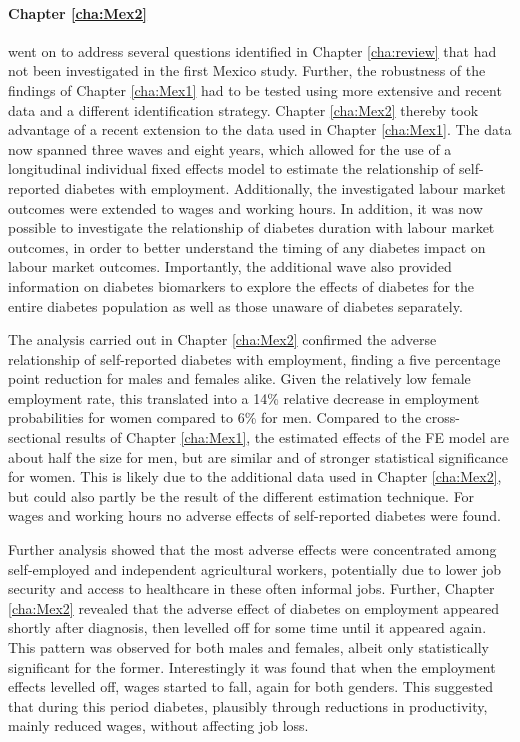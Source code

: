 \paragraph{Chapter \ref{cha:Mex2}}  went on to address several questions identified in Chapter \ref{cha:review} that had not been investigated in the first Mexico study. Further, the robustness of the findings of Chapter \ref{cha:Mex1} had to be tested using more extensive and recent data and a different identification strategy. Chapter \ref{cha:Mex2} thereby took advantage of a recent extension to the data used in Chapter \ref{cha:Mex1}. The data now spanned three waves and eight years, which allowed for the use of a longitudinal individual fixed effects model to estimate the relationship of self-reported diabetes with employment. Additionally, the investigated labour market outcomes were extended to wages and working hours. In addition, it was now possible to investigate the relationship of diabetes duration with labour market outcomes, in order to better understand the timing of any diabetes impact on labour market outcomes. Importantly, the additional wave also provided information on diabetes biomarkers to explore the effects of diabetes for the entire diabetes population as well as those unaware of diabetes separately.

The analysis carried out in Chapter \ref{cha:Mex2} confirmed the adverse relationship of self-reported diabetes with employment, finding a five percentage point reduction for males and females alike. Given the relatively low female employment rate, this translated into a 14\% relative decrease in employment probabilities for women compared to 6\% for men. Compared to the cross-sectional results of Chapter \ref{cha:Mex1}, the estimated effects of the \ac{FE} model are about half the size for men, but are similar and of stronger statistical significance for women. This is likely due to the additional data used in Chapter \ref{cha:Mex2}, but could also partly be the result of the different estimation technique. For wages and working hours no adverse effects of self-reported diabetes were found.

Further analysis showed that the most adverse effects were concentrated among self-employed and independent agricultural workers, potentially due to lower job security and access to healthcare in these often informal jobs. Further, Chapter \ref{cha:Mex2} revealed that the adverse effect of diabetes on employment appeared shortly after diagnosis, then levelled off for some time until it appeared again. This pattern was observed for both males and females, albeit only statistically significant for the former. Interestingly it was found that when the employment effects levelled off, wages started to fall, again for both genders. This suggested that during this period diabetes, plausibly through reductions in productivity, mainly reduced wages, without affecting job loss.


